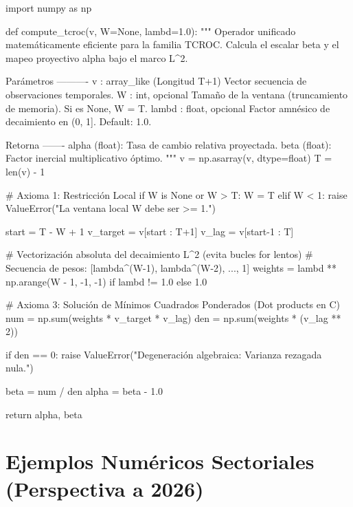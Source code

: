\begin{listing}[H]
\begin{python}
import numpy as np

def compute_tcroc(v, W=None, lambd=1.0):
    """
    Operador unificado matemáticamente eficiente para la familia TCROC.
    Calcula el escalar beta y el mapeo proyectivo alpha bajo el marco L^2.

    Parámetros
    ----------
    v : array_like (Longitud T+1)
        Vector secuencia de observaciones temporales.
    W : int, opcional
        Tamaño de la ventana (truncamiento de memoria). Si es None, W = T.
    lambd : float, opcional
        Factor amnésico de decaimiento en (0, 1]. Default: 1.0.

    Retorna
    -------
    alpha (float): Tasa de cambio relativa proyectada.
    beta (float): Factor inercial multiplicativo óptimo.
    """
    v = np.asarray(v, dtype=float)
    T = len(v) - 1
    
    # Axioma 1: Restricción Local
    if W is None or W > T:
        W = T
    elif W < 1:
        raise ValueError("La ventana local W debe ser >= 1.")

    start = T - W + 1
    v_target = v[start : T+1]
    v_lag    = v[start-1 : T]

    # Vectorización absoluta del decaimiento L^2 (evita bucles for lentos)
    # Secuencia de pesos: [lambda^(W-1), lambda^(W-2), ..., 1]
    weights = lambd ** np.arange(W - 1, -1, -1) if lambd != 1.0 else 1.0

    # Axioma 3: Solución de Mínimos Cuadrados Ponderados (Dot products en C)
    num = np.sum(weights * v_target * v_lag)
    den = np.sum(weights * (v_lag ** 2))

    if den == 0:
        raise ValueError("Degeneración algebraica: Varianza rezagada nula.")

    beta = num / den
    alpha = beta - 1.0
    
    return alpha, beta
\end{python}
\caption{Función unificada en Python para calcular las variantes de la TCROC.}
\label{lst:tcroc_implementacion}
\end{listing}


\section[Ejemplos Numéricos Sectoriales]{Ejemplos Numéricos Sectoriales (Perspectiva a 2026)}
\label{sec:tcroc_ejemplos}

